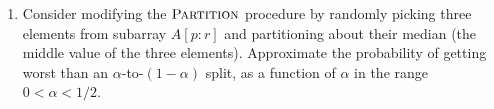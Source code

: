 \documentclass[12pt,reqno]{amsart}
\newif\ifanswer
\begin{document}
\begin{enumerate}[1.]
\item Consider modifying the $\textsc{Partition}$ procedure by randomly picking three elements from subarray $A[p: r]$ and partitioning about their median (the middle value of the three elements). Approximate the probability of getting worst than an $\alpha$-to-$(1 - \alpha)$ split, as a function of $\alpha$ in the range $0 < \alpha < 1/2$.

\ifanswer
{}

\end{enumerate}
\end{document}
